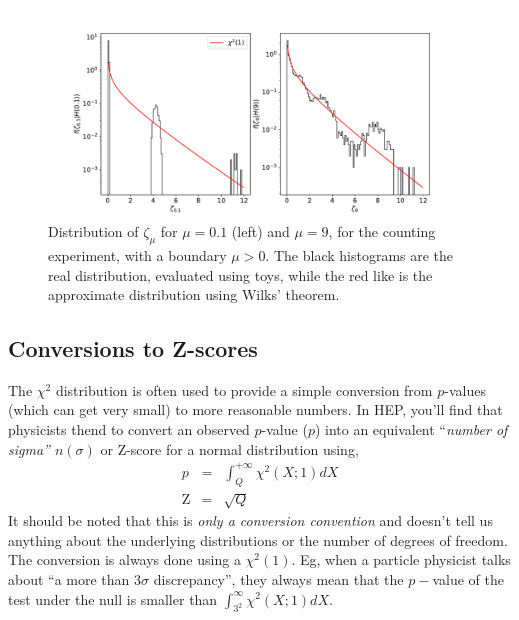 \begin{figure}
    \centering
    \includegraphics[width=\textwidth]{figures/Intervals/tmu_dists_example.pdf}
    \caption{Distribution of $\zeta_{\mu}$ for $\mu=0.1$ (left) and $\mu=9$, for the counting experiment, with a boundary $\mu>0$. The black histograms are the real distribution, evaluated using toys, while the red like is the approximate distribution using Wilks' theorem.}
    \label{fig:chisquare_zetamu}
\end{figure}

\subsection{Conversions to Z-scores}
The $\chi^{2}$ distribution is often used to provide a simple conversion from $p$-values (which can get very small) to more reasonable numbers. In HEP, you'll find that physicists thend to convert an observed $p$-value ($p$) into an equivalent ``\emph{number of sigma'' $n(\sigma)$} or Z-score for a normal distribution using, 
\begin{eqnarray}
    p & = &  \int_{Q}^{+\infty}\chi^{2}(X;1)dX \\
    \mathrm{Z}& = & \sqrt{Q}
\end{eqnarray} 
It should be noted that this is \emph{only a conversion convention} and doesn't tell us anything about the underlying distributions or the number of degrees of freedom. The conversion is always done using a $\chi^{2}(1)$. Eg, when a particle physicist talks about ``a more than 3$\sigma$ discrepancy'', they always mean that the $p-$value of the test under the null is smaller than $\int_{3^{2}}^{\infty}\chi^{2}(X;1)dX$. 

